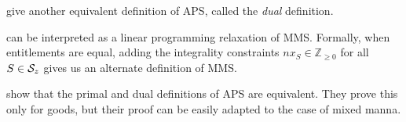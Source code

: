\citet{babaioff2023fair} give another equivalent definition of APS,
called the \emph{dual} definition.


 can be interpreted as a linear programming relaxation of MMS.
Formally, when entitlements are equal, adding the integrality constraints
$nx_S \in \mathbb{Z}_{\ge 0}$ for all $S \in \mathcal{S}_z$ gives us an alternate definition of MMS.

\citet{babaioff2023fair} show that the primal and dual definitions of APS are equivalent.
They prove this only for goods, but their proof can be easily adapted to the case of mixed manna.

